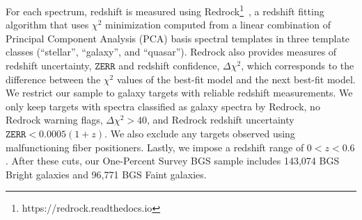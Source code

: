 For each spectrum, redshift is measured using 
{\sc Redrock}\footnote{https://redrock.readthedocs.io}~\citep{bailey2022}, 
a redshift fitting algorithm that uses $\chi^2$ minimization computed from a
linear combination of Principal Component Analysis (PCA) basis spectral
templates in three template classes (``stellar'',  ``galaxy'', and ``quasar'').
{\sc Redrock} also provides measures of redshift uncertainty, $\mathtt{ZERR}$
and redshift confidence, $\Delta\chi^2$, which corresponds to the difference
between the $\chi^2$ values of the best-fit model and the next best-fit model.
We restrict our sample to galaxy targets with reliable redshift measurements.
We only keep targets with spectra classified as galaxy spectra by 
{\sc Redrock}, no {\sc Redrock} warning flags, $\Delta\chi^2 > 40$,
and {\sc Redrock} redshift uncertainty $\mathtt{ZERR} < 0.0005 (1 + z)$.
We also exclude any targets observed using malfunctioning fiber positioners.
Lastly, we impose a redshift range of $0 < z < 0.6$.  
After these cuts, our One-Percent Survey BGS sample includes 143,074 BGS Bright
galaxies and 96,771 BGS Faint galaxies.
